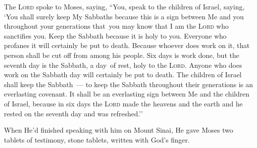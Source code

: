 \begin{inparaenum}
   The \textsc{Lord} spoke to Moses, saying,%
   ``You, speak to the children of Israel, saying, `You shall surely keep My Sabbaths because this is a sign between Me and you throughout your generations that\understood\ you may know that I am the \textsc{Lord} who sanctifies you.%
   Keep the Sabbath because it is holy to you. Everyone who profanes it will certainly be put to death. Because whoever does work on it, that person shall be cut off from among his people.%
   Six days is work done, but the seventh day is the Sabbath, a day\understood\ of rest, holy to the \textsc{Lord}. Anyone who does work on the Sabbath day will certainly be put to death.%
   The children of Israel shall keep the Sabbath~--- to keep the Sabbath throughout their generations is an everlasting covenant.%
   It shall be an everlasting sign between Me and the children of Israel, because in six days the \textsc{Lord} made the heavens and the earth and he rested on the seventh day and was refreshed.''%
  
   When He'd finished speaking with him on Mount Sinai, He gave Moses two tablets of testimony, stone tablets, written with God's finger.%
\end{inparaenum}
